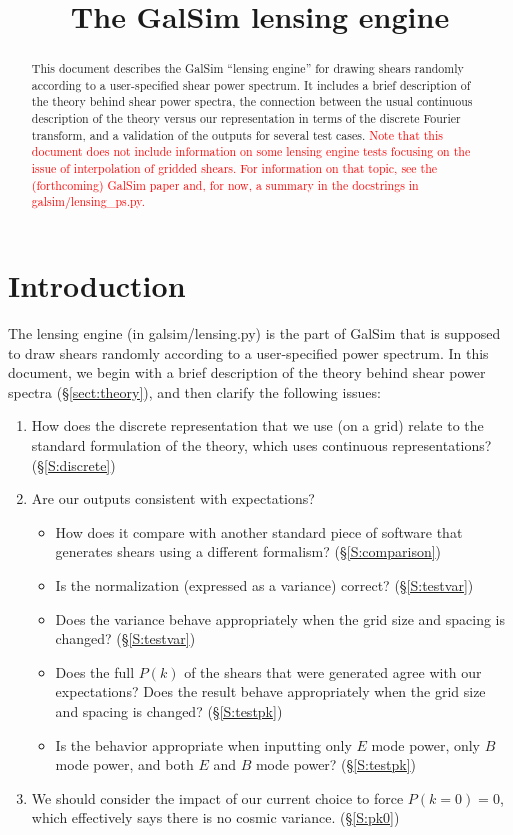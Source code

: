 \documentclass[preprint]{aastex}
\begin{document}
\title{The GalSim lensing engine}

\begin{abstract}
This document describes the GalSim ``lensing engine'' for drawing
shears randomly according to a user-specified shear power spectrum.
It includes a brief description of the theory behind shear power
spectra, the connection between the usual continuous description of
the theory versus our representation in terms of the discrete Fourier
transform, and a validation of the outputs for several test
cases. {\Large \textcolor{red}{Note that this document does not
    include information on some lensing engine tests focusing on the
    issue of interpolation of gridded shears.  For information on that
  topic, see the (forthcoming) GalSim paper and, for now, a summary in
the docstrings in galsim/lensing\_ps.py.}} 
\end{abstract}

\tableofcontents

\section{Introduction}

The lensing engine (in galsim/lensing.py) is the part of GalSim that
is supposed to draw shears randomly according to a user-specified
power spectrum.  In this document, we begin with a brief description
of the theory behind shear power spectra (\S\ref{sect:theory}), and then clarify the following
issues:
\begin{enumerate}
\item How does the discrete representation that we use (on a grid)
  relate to the standard formulation of the theory, which uses
  continuous representations?  (\S\ref{S:discrete})
\item Are our outputs consistent with expectations?
\begin{itemize}
\item How does it compare with another standard piece of software that
  generates shears using a different formalism? (\S\ref{S:comparison})
\item Is the normalization (expressed as a variance) correct? (\S\ref{S:testvar})
\item Does the variance behave appropriately when the grid size and
  spacing is changed? (\S\ref{S:testvar})
\item Does the full $P(k)$ of the shears that were generated agree
  with our expectations?  Does the result behave appropriately when
  the grid size and spacing is changed? (\S\ref{S:testpk})
\item Is the behavior appropriate when inputting only $E$ mode power,
  only $B$ mode power, and both $E$ and $B$ mode power? (\S\ref{S:testpk})
\end{itemize}
\item We should consider the impact of our current choice to force
  $P(k=0)=0$, which effectively says there is no cosmic variance. (\S\ref{S:pk0})
\end{enumerate}
\end{document}
